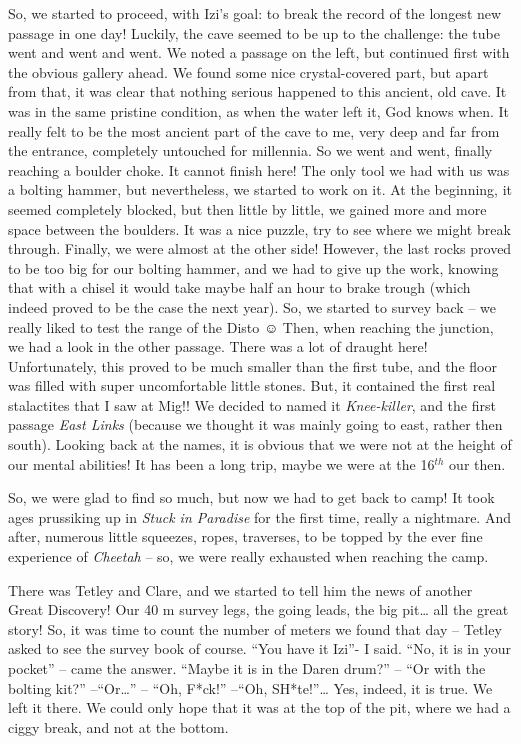 So, we started to proceed, with Izi's goal: to break the record of the
longest new passage in one day! Luckily, the cave seemed to be up to the
challenge: the tube went and went and went. We noted a passage on the
left, but continued first with the obvious gallery ahead. We found some
nice crystal-covered part, but apart from that, it was clear that
nothing serious happened to this ancient, old cave. It was in the same
pristine condition, as when the water left it, God knows when. It really
felt to be the most ancient part of the cave to me, very deep and far
from the entrance, completely untouched for millennia. So we went and
went, finally reaching a boulder choke. It cannot finish here! The only
tool we had with us was a bolting hammer, but nevertheless, we started
to work on it. At the beginning, it seemed completely blocked, but then
little by little, we gained more and more space between the boulders. It
was a nice puzzle, try to see where we might break through. Finally, we
were almost at the other side! However, the last rocks proved to be too
big for our bolting hammer, and we had to give up the work, knowing that
with a chisel it would take maybe half an hour to brake trough (which
indeed proved to be the case the next year). So, we started to survey
back -- we really liked to test the range of the Disto ☺ Then, when
reaching the junction, we had a look in the other passage. There was a
lot of draught here! Unfortunately, this proved to be much smaller than
the first tube, and the floor was filled with super uncomfortable little
stones. But, it contained the first real stalactites that I saw at Mig!!
We decided to named it \emph{Knee-killer}, and the first passage
\emph{East Links} (because we thought it was mainly going to east,
rather then south). Looking back at the names, it is obvious that we
were not at the height of our mental abilities! It has been a long trip,
maybe we were at the 16\(^{th}\) our then.

So, we were glad to find so much, but now we had to get back to camp! It
took ages prussiking up in \emph{Stuck in Paradise} for the first time,
really a nightmare. And after, numerous little squeezes, ropes,
traverses, to be topped by the ever fine experience of \emph{Cheetah} --
so, we were really exhausted when reaching the camp.

There was Tetley and Clare, and we started to tell him the news of
another Great Discovery! Our 40 m survey legs, the going leads, the big
pit\ldots{} all the great story! So, it was time to count the number of
meters we found that day -- Tetley asked to see the survey book of
course. ``You have it Izi''- I said. ``No, it is in your pocket'' --
came the answer. ``Maybe it is in the Daren drum?'' -- ``Or with the
bolting kit?'' --``Or\ldots{}'' -- ``Oh, F*ck!'' --``Oh,
SH*te!''\ldots{} Yes, indeed, it is true. We left it there. We could
only hope that it was at the top of the pit, where we had a ciggy break,
and not at the bottom.

